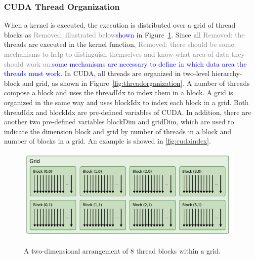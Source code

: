 \documentclass[Ingles]{ic-tese-v1}
\newcommand{\rem}[1]{\noindent\textcolor{gray}{Removed: {#1}}}
\newcommand{\new}[1]{\noindent\textcolor{blue}{ {#1}}}
\newcommand{\rem}[1]{}
\newcommand{\new}[1]{#1}
\newcommand{\rfig}[1]{Figure~\ref{fig:#1}}
\begin{document}
\subsubsection{CUDA Thread Organization}
\label{CUDA Thread Organization}
When a kernel is executed, the execution is distributed over a grid of thread
blocks as \rem{illustrated below}\new{shown} in \rfig{threadsblocks}. Since all \rem{the} threads are executed in the kernel function, \rem{there should be some mechanisms to help to distinguish themselves and know what area of data they should work on.}\new{some mechanisms are necessary to define in which data area the threads must work.} In CUDA, all threads are organized in two-level hierarchy-block and grid, as shown in \rfig{threadorganization}. A number of threads compose a block and uses the threadIdx to index them in a block. A grid is organized in the same way and uses blockIdx to index each block in a grid. Both threadIdx and blockIdx are pre-defined variables of CUDA. In addition, there are another two pre-defined variables blockDim and gridDim, which are used to indicate the dimension block and grid by number of threads in a block and number of blocks in a grid. An example is showed in \ref{fig:cudaindex}.

\begin{figure}[t]
	\centering
	\caption{A two-dimensional arrangement of 8 thread blocks within a grid.}
	\includegraphics[scale=0.70]{images/threadsblock.png}
	\label{fig:threadsblocks}
\end{figure}
\end{document}
